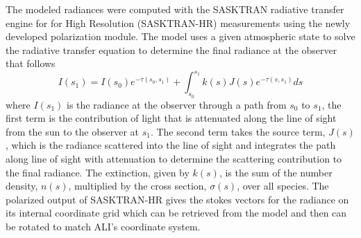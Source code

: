 \documentclass[12pt]{article}
\begin{document}
The modeled radiances were computed with the SASKTRAN radiative transfer engine \citep{Bourassa2008a} for for High Resolution (SASKTRAN-HR) \citep{Zawada2015} measurements using the newly developed polarization module. The model uses a given atmospheric state to solve the radiative transfer equation to determine the final radiance at the observer that follows
\begin{equation}
    I(s_{1}) = I(s_{0})e^{-\tau(s_{0}, s_{1})}+\int^{s_{1}}_{s_{0}}k(s)J(s)e^{-\tau(s, s_{1})}ds
\end{equation}
where $I(s_{1})$ is the radiance at the observer through a path from $s_{0}$ to $s_{1}$, the first term is the contribution of light that is attenuated along the line of sight from the sun to the observer at $s_{1}$. The second term takes the source term, $J(s)$, which is the radiance scattered into the line of sight and integrates the path along line of sight with attenuation to determine the scattering contribution to the final radiance. The extinction, given by $k(s)$, is the sum of the number density, $n(s)$, multiplied by the cross section, $\sigma(s)$, over all species. The polarized output of SASKTRAN-HR gives the stokes vectors for the radiance on its internal coordinate grid which can be retrieved from the model and then can be rotated to match ALI's coordinate system.
\end{document}
